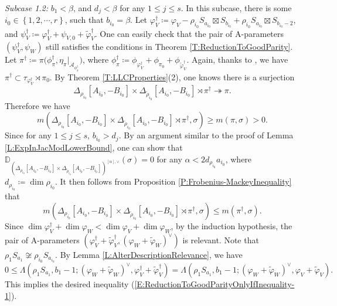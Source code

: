 \documentclass[11pt,letterpaper]{amsart}
\theoremstyle{plain}
\numberwithin{theorem}{section}
\numberwithin{equation}{subsection}
\theoremstyle{remark}
\newcommand{\D}{\mathbb{D}}
\def\calA{\mathcal{A}}
\begin{document}
\emph{Subcase 1.2:} $b_1<\beta$, and $d_j<\beta$ for any $1\leq j\leq s$. In this subcase, there is some $i_0\in\left\{1,2,\cdots,r\right\}$, such that $b_{i_0}=\beta$. Let $\varphi_V^\dagger\coloneqq \varphi_V - \rho_{i_0} S_{a_{i_0}}\boxtimes S_{b_{i_0}} + \rho_{i_0} S_{a_{i_0}}\boxtimes S_{b_{i_0}-2}$, and $\psi_V^\dagger \coloneqq \varphi_V^\dagger + \psi_{V,0} + \widetilde{\varphi}_V^\dagger$. One can easily check that the pair of A-parameters $\left(\psi_V^\dagger,\psi_W\right)$ still satisfies the conditions in Theorem \ref{T:ReductionToGoodParity}. Let $\pi^\dagger\coloneqq\pi\Big(\phi_\pi^\dagger,\eta_\pi\big|_{\calA_{\phi_\pi^\dagger}}\Big)$, where $\phi_\pi^\dagger\coloneqq \phi_{\varphi_V^\dagger} + \phi_{\pi_0} + \phi_{\widetilde{\varphi}_V^\dagger}$. Again, thanks to \cite[Prop. 5.3]{MR2504024}, we have $\pi^\dagger\subset\tau_{\varphi_V^\dagger}\rtimes\pi_0$. By Theorem \ref{T:LLCProperties}(2), one knows there is a surjection
\[
    \Delta_{\rho_{i_0}}\left[A_{i_0},-B_{i_0}\right] \times \Delta_{\widetilde{\rho}_{i_0}}\left[A_{i_0},-B_{i_0}\right] \rtimes \pi^\dagger\twoheadrightarrow \pi.
\]
Therefore we have
\[
    m\left(\Delta_{\rho_{i_0}}\left[A_{i_0},-B_{i_0}\right] \times \Delta_{\widetilde{\rho}_{i_0}}\left[A_{i_0},-B_{i_0}\right] \rtimes \pi^\dagger,\sigma\right) \geq m\left(\pi,\sigma\right) > 0.
\]
Since for any $1\leq j\leq s$, $b_{i_0}>d_j$. By an argument similar to the proof of Lemma \ref{L:ExpInJacModLowerBound}, one can show that $\D_{\left(\Delta_{\rho_{i_0}}\left[A_{i_0},-B_{i_0}\right] \times \Delta_{\widetilde{\rho}_{i_0}}\left[A_{i_0},-B_{i_0}\right]\right)^{[\alpha],\vee}}\left(\sigma\right) = 0$
for any $\alpha<2d_{\rho_{i_0}}a_{i_0}$, where $d_{\rho_{i_0}}\coloneqq \dim\rho_{i_0}$. It then follows from Proposition \ref{P:Frobenius-MackeyInequality} that
\[
    m\left(\Delta_{\rho_{i_0}}\left[A_{i_0},-B_{i_0}\right] \times \Delta_{\widetilde{\rho}_{i_0}}\left[A_{i_0},-B_{i_0}\right] \rtimes \pi^\dagger,\sigma\right) \leq m\left(\pi^\dagger,\sigma\right).
\]
Since $\dim\varphi_V^\dagger+\dim\varphi_W<\dim\varphi_V+\dim\varphi_W$, by the induction hypothesis, the pair of A-parameters $\left(\varphi_V^\dagger+\widetilde{\varphi}_V^\dagger, \left(\varphi_W+\widetilde{\varphi}_W\right)^\vee\right)$ is relevant. Note that $\rho_1 S_{a_1}\not\cong \rho_{i_0} S_{a_{i_0}}$. By Lemma \ref{L:AlterDescriptionRelevance}, we have
\[
    0\leq \Lambda\left(\rho_1 S_{a_1}, b_1-1;\left(\varphi_W+\widetilde{\varphi}_W\right)^\vee,\varphi_V^\dagger+\widetilde{\varphi}_V^\dagger\right) = \Lambda\left(\rho_1 S_{a_1}, b_1-1;\left(\varphi_W+\widetilde{\varphi}_W\right)^\vee,\varphi_V+\widetilde{\varphi}_V\right).
\]
This implies the desired inequality (\ref{E:ReductionToGoodParityOnlyIfInequality-1}).
\end{document}
